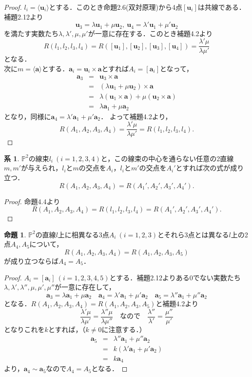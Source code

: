 \documentclass{jsarticle}
\theoremstyle{definition}
\newtheorem{prop}[theorem]{命題}
\newtheorem{cor}[theorem]{系}
\numberwithin{theorem}{section}
\numberwithin{equation}{section}
\begin{document}
\begin{proof}
    $l_i=\langle\bm{u}_i\rangle$とする．このとき命題2.6(双対原理)から4点$[\bm{u}_i]$は共線である．補題2.12より
    $$\bm{u}_3=\lambda\bm{u}_1+\mu\bm{u}_2,\ \bm{u}_4=\lambda'\bm{u}_1+\mu'\bm{u}_2$$
    を満たす実数たち$\lambda,\lambda',\mu,\mu'$が一意に存在する．このとき補題4.2より
    $$R(l_1,l_2,l_3,l_4)=R([\bm{u}_1],[\bm{u}_2],[\bm{u}_3],[\bm{u}_4])=\frac{\lambda'\mu}{\lambda\mu'}$$となる．
    \\次に$m=\langle\bm{a}\rangle$とする．$\bm{a}_i=\bm{u}_i\times\bm{a}$とすれば$A_i=[\bm{a}_i]$となって，
    \begin{eqnarray*}
        \bm{a}_3&=&\bm{u}_3\times\bm{a}\\
        &=&(\lambda\bm{u}_1+\mu\bm{u}_2)\times\bm{a}\\
        &=&\lambda(\bm{u}_1\times\bm{a})+\mu(\bm{u}_2\times\bm{a})\\
        &=&\lambda\bm{a}_1+\mu\bm{a}_2
    \end{eqnarray*}となり，同様に$\bm{a}_4=\lambda'\bm{a}_1+\mu'\bm{a}_2$．
    よって補題4.2より，
    $$R(A_1,A_2,A_3,A_4)=\frac{\lambda'\mu}{\lambda\mu'}=R(l_1,l_2,l_3,l_4).$$
\end{proof}
\begin{cor}
    $\mathbb{P}^2$の線束$l_i\ (i=1,2,3,4)$と，この線束の中心を通らない任意の2直線$m,m'$が与えられ，$l_i$と$m$の交点を$A_i$，$l_i$と$m'$の交点を$A_i'$とすれば次の式が成り立つ．
    $$R(A_1,A_2,A_3,A_4)=R(A_1',A_2',A_3',A_4').$$
\end{cor}
\begin{proof}
    命題4.4より
    $$R(A_1,A_2,A_3,A_4)=R(l_1,l_2,l_3,l_4)=R(A_1',A_2',A_3',A_4').$$
\end{proof}
\begin{prop}
    $\mathbb{P}^2$の直線$l$上に相異なる3点$A_i\ (i=1,2,3)$とそれら3点とは異なる$l$上の2点$A_4,A_5$について，
    $$R(A_1,A_2,A_3,A_4)=R(A_1,A_2,A_3,A_5)$$
    が成り立つならば$A_4=A_5$．
\end{prop}
\begin{proof}
    $A_i=[\bm{a}_i]\ (i=1,2,3,4,5)$とする．補題2.12よりある0でない実数たち$\lambda,\lambda',\lambda'',\mu,\mu',\mu''$が一意に存在して，
    $$\bm{a}_3=\lambda\bm{a}_1+\mu\bm{a}_2\quad\bm{a}_4=\lambda'\bm{a}_1+\mu'\bm{a}_2\quad\bm{a}_5=\lambda''\bm{a}_1+\mu''\bm{a}_2$$となる．$R(A_1,A_2,A_3,A_4)=R(A_1,A_2,A_3,A_5)$と補題4.2より$$\frac{\lambda'\mu}{\lambda\mu'}=\frac{\lambda''\mu}{\lambda\mu''}\quad\text{なので}\quad\frac{\lambda''}{\lambda'}=\frac{\mu''}{\mu'}$$となりこれを$k$とすれば，（$k\neq0$に注意する．）
    \begin{eqnarray*}
        \bm{a}_5&=&\lambda''\bm{a}_1+\mu''\bm{a}_2\\
        &=&k(\lambda'\bm{a}_1+\mu'\bm{a}_2)\\
        &=&k\bm{a}_4
    \end{eqnarray*}より，$\bm{a}_4\sim\bm{a}_5$なので$A_4=A_5$となる．
\end{proof}
\end{document}
